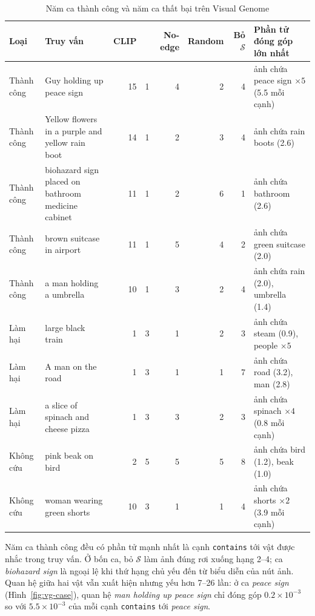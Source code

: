 \begin{table}[!t]
\centering
\footnotesize
\setlength{\tabcolsep}{3pt}
\caption{Năm ca thành công và năm ca thất bại trên Visual Genome}
\label{tab:vg-cases}
\begin{tabularx}{\linewidth}{@{}lYrrrrrY@{}}
\toprule
Loại & Truy vấn & CLIP &  & No-edge & Random & Bỏ $\mathcal S$ & Phần tử đóng góp lớn nhất\\
\midrule
Thành công & Guy holding up peace sign & 15 & 1 & 4 & 2 & 4 & ảnh chứa peace sign $\times5$ (5.5 mỗi cạnh)\\
Thành công & Yellow flowers in a purple and yellow rain boot & 14 & 1 & 2 & 3 & 4 & ảnh chứa rain boots (2.6)\\
Thành công & biohazard sign placed on bathroom medicine cabinet & 11 & 1 & 2 & 6 & 1 & ảnh chứa bathroom (2.6)\\
Thành công & brown suitcase in airport & 11 & 1 & 5 & 4 & 2 & ảnh chứa green suitcase (2.0)\\
Thành công & a man holding a umbrella & 10 & 1 & 3 & 2 & 4 & ảnh chứa rain (2.0), umbrella (1.4)\\
\midrule
Làm hại & large black train & 1 & 3 & 1 & 2 & 3 & ảnh chứa steam (0.9), people $\times5$\\
Làm hại & A man on the road & 1 & 3 & 1 & 1 & 7 & ảnh chứa road (3.2), man (2.8)\\
Làm hại & a slice of spinach and cheese pizza & 1 & 3 & 3 & 2 & 3 & ảnh chứa spinach $\times4$ (0.8 mỗi cạnh)\\
Không cứu & pink beak on bird & 2 & 5 & 5 & 5 & 8 & ảnh chứa bird (1.2), beak (1.0)\\
Không cứu & woman wearing green shorts & 10 & 3 & 1 & 1 & 4 & ảnh chứa shorts $\times2$ (3.9 mỗi cạnh)\\
\bottomrule
\end{tabularx}
\end{table}

Năm ca thành công đều có phần tử mạnh nhất là cạnh \texttt{contains} tới vật được nhắc trong truy vấn. Ở bốn ca, bỏ $\mathcal S$ làm ảnh đúng rơi xuống hạng 2--4; ca \textit{biohazard sign} là ngoại lệ khi thứ hạng chủ yếu đến từ biểu diễn của nút ảnh. Quan hệ giữa hai vật vẫn xuất hiện nhưng yếu hơn 7--26 lần: ở ca \textit{peace sign} (Hình~\ref{fig:vg-case}), quan hệ \textit{man holding up peace sign} chỉ đóng góp $0.2\times10^{-3}$ so với $5.5\times10^{-3}$ của mỗi cạnh \texttt{contains} tới \textit{peace sign}.

